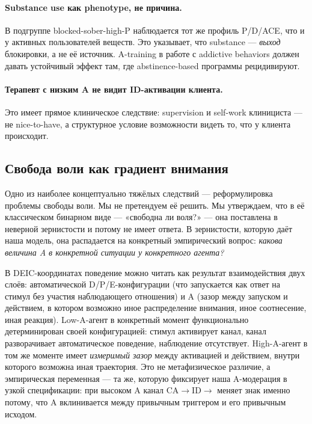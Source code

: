 \paragraph{Substance use как phenotype, не причина.} В подгруппе blocked-sober-high-P наблюдается тот же профиль P/D/ACE, что и у активных пользователей веществ. Это указывает, что substance --- \emph{выход} блокировки, а не её источник. A-training в работе с addictive behaviors должен давать устойчивый эффект там, где abstinence-based программы рецидивируют.

\paragraph{Терапевт с низким A не видит ID-активации клиента.} Это имеет прямое клиническое следствие: supervision и self-work клинициста --- не nice-to-have, а структурное условие возможности видеть то, что у клиента происходит.

\subsection{Свобода воли как градиент внимания}
\label{subsec:free_will}

Одно из наиболее концептуально тяжёлых следствий \DEIC{} --- реформулировка проблемы свободы воли. Мы не претендуем её решить. Мы утверждаем, что в её классическом бинарном виде --- «свободна ли воля?» --- она поставлена в неверной зернистости и потому не имеет ответа. В зернистости, которую даёт наша модель, она распадается на конкретный эмпирический вопрос: \emph{какова величина A в конкретной ситуации у конкретного агента?}

В DEIC-координатах поведение можно читать как результат взаимодействия двух слоёв: автоматической D/P/E-конфигурации (что запускается как ответ на стимул без участия наблюдающего отношения) и A (зазор между запуском и действием, в котором возможно иное распределение внимания, иное соотнесение, иная реакция). Low-A-агент в конкретный момент функционально детерминирован своей конфигурацией: стимул активирует канал, канал разворачивает автоматическое поведение, наблюдение отсутствует. High-A-агент в том же моменте имеет \emph{измеримый зазор} между активацией и действием, внутри которого возможна иная траектория. Это не метафизическое различие, а эмпирическая переменная --- та же, которую фиксирует наша A-модерация в узкой спецификации: при высоком A канал CA$\to$ID$\to$\EAF{} меняет знак именно потому, что A вклинивается между привычным триггером и его привычным исходом.

